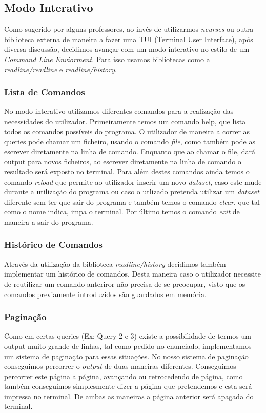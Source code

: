 \documentclass{article}
\begin{document}
    \subsection{Modo Interativo}
            Como sugerido por alguns professores, ao invés de utilizarmos \emph{ncurses} ou outra 
            biblioteca externa de maneira a fazer uma TUI (Terminal User Interface), após diversa 
            discussão, decidimos avançar com um modo interativo no estilo de um \emph{Command Line 
            Enviorment}. Para isso usamos bibliotecas como a \emph{readline/readline} e 
            \emph{readline/history}. 
        \subsubsection{Lista de Comandos}
            No modo interativo utilizamos diferentes comandos para a realização das necessidades do
            utilizador. Primeiramente temos um comando help, que lista todos os comandos possíveis 
            do programa. O utilizador de maneira a correr as queries pode chamar um ficheiro, usando 
            o comando \emph{file}, como também pode as escrever diretamente na linha de comando. Enquanto 
            que ao chamar o file, dará output para novos ficheiros, ao escrever diretamente na linha de 
            comando o resultado será exposto no terminal. Para além destes comandos ainda temos o comando 
            \emph{reload} que permite ao utilizador inserir um novo \emph{dataset}, caso este mude 
            durante a utilização do programa ou caso o utlizado pretenda utilizar um \emph{dataset}
            diferente sem ter que sair do programa e também temos o comando \emph{clear}, que tal como
            o nome indica, impa o terminal. Por último temos o comando \emph{exit} de maneira a sair do 
            programa.
        \subsubsection{Histórico de Comandos}
            Através da utilização da biblioteca \emph{readline/history} decidimos também implementar um 
            histórico de comandos. Desta maneira caso o utilizador necessite de reutilizar um comando 
            anteriror não precisa de se preocupar, visto que os comandos previamente introduzidos são 
            guardados em memória.
        \subsubsection{Paginação}
            Como em certas queries (Ex: Query 2 e 3) existe a possibilidade de termos um output muito 
            grande de linhas, tal como pedido no enunciado, implementamos um sistema de paginação para
            essas situações. No nosso sistema de paginação conseguimos percorrer o \emph{output} de duas 
            maneiras diferentes. Conseguimos percorrer este página a página, avançando ou retrocedendo de
            página, como também conseguimos simplesmente dizer a página que pretendemos e esta será impressa 
            no terminal. De ambas as maneiras a página anterior será apagada do terminal.
\end{document}
